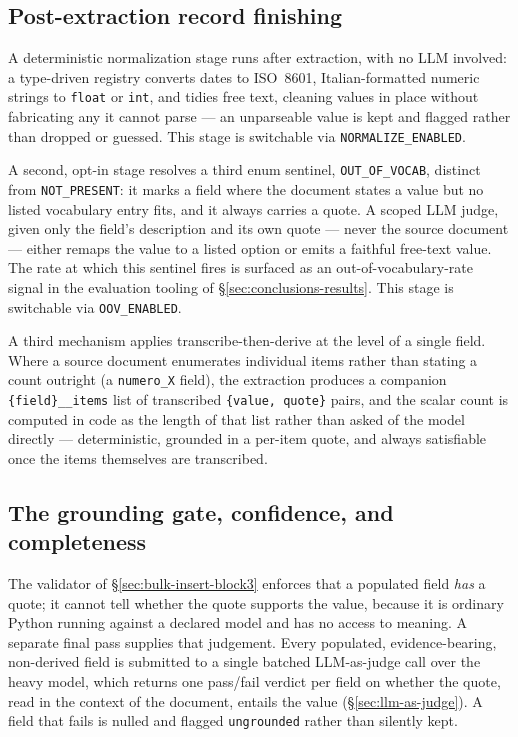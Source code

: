 \subsection{Post-extraction record finishing}
\label{sec:bulk-insert-normalization}

A deterministic normalization stage runs after extraction, with no LLM involved: a type-driven registry converts dates to ISO~8601, Italian-formatted numeric strings to \texttt{float} or \texttt{int}, and tidies free text, cleaning values in place without fabricating any it cannot parse — an unparseable value is kept and flagged rather than dropped or guessed. This stage is switchable via \texttt{NORMALIZE\_ENABLED}.

A second, opt-in stage resolves a third enum sentinel, \texttt{OUT\_OF\_VOCAB}, distinct from \texttt{NOT\_PRESENT}: it marks a field where the document states a value but no listed vocabulary entry fits, and it always carries a quote. A scoped LLM judge, given only the field's description and its own quote — never the source document — either remaps the value to a listed option or emits a faithful free-text value. The rate at which this sentinel fires is surfaced as an out-of-vocabulary-rate signal in the evaluation tooling of \S\ref{sec:conclusions-results}. This stage is switchable via \texttt{OOV\_ENABLED}.

A third mechanism applies transcribe-then-derive at the level of a single field. Where a source document enumerates individual items rather than stating a count outright (a \texttt{numero\_X} field), the extraction produces a companion \texttt{\{field\}\_\_items} list of transcribed \texttt{\{value, quote\}} pairs, and the scalar count is computed in code as the length of that list rather than asked of the model directly — deterministic, grounded in a per-item quote, and always satisfiable once the items themselves are transcribed.

\subsection{The grounding gate, confidence, and completeness}
\label{sec:bulk-insert-grounding}

The validator of \S\ref{sec:bulk-insert-block3} enforces that a populated field \emph{has} a quote; it cannot tell whether the quote supports the value, because it is ordinary Python running against a declared model and has no access to meaning. A separate final pass supplies that judgement. Every populated, evidence-bearing, non-derived field is submitted to a single batched LLM-as-judge call over the heavy model, which returns one pass/fail verdict per field on whether the quote, read in the context of the document, entails the value (\S\ref{sec:llm-as-judge}). A field that fails is nulled and flagged \texttt{ungrounded} rather than silently kept.

